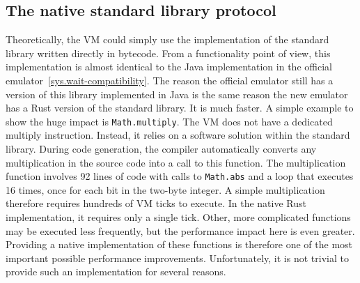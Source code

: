 \subsection{The native standard library protocol} \label{jack-stdlib-in-rust}
Theoretically, the VM could simply use the implementation of the standard library written directly in bytecode.
From a functionality point of view, this implementation is almost identical to the Java implementation in the official emulator~\ref{sys.wait-compatibility}.
The reason the official emulator still has a version of this library implemented in Java is the same reason the new emulator has a Rust version of the standard library. It is much faster.
A simple example to show the huge impact is \verb+Math.multiply+. The VM does not have a dedicated multiply instruction. Instead, it relies on a software solution within the standard library. During code generation, the compiler automatically converts any multiplication in the source code into a call to this function.
The multiplication function involves 92 lines of code with calls to \verb+Math.abs+ and a loop that executes 16 times, once for each bit in the two-byte integer. A simple multiplication therefore requires hundreds of VM ticks to execute.
In the native Rust implementation, it requires only a single tick.
Other, more complicated functions may be executed less frequently, but the performance impact here is even greater.
Providing a native implementation of these functions is therefore one of the most important possible performance improvements.
Unfortunately, it is not trivial to provide such an implementation for several reasons.

